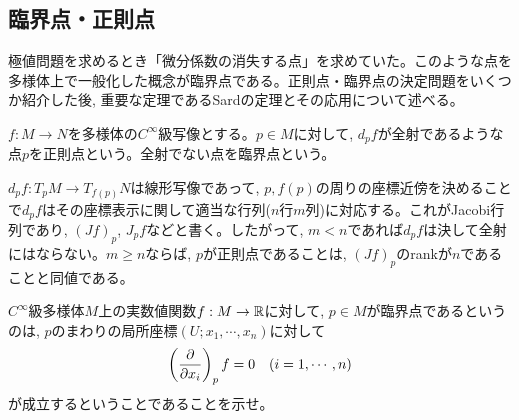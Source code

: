 \subsection{臨界点・正則点}
極値問題を求めるとき「微分係数の消失する点」を求めていた。このような点を多様体上で一般化した概念が臨界点である。正則点・臨界点の決定問題をいくつか紹介した後, 重要な定理であるSardの定理とその応用について述べる。

\begin{defn}
$f:M\to N$を多様体の$C^{\infty}$級写像とする。$p\in M$に対して, $d_{p}f$が全射であるような点$p$を正則点という。全射でない点を臨界点という。
\end{defn}
$d_{p}f:T_{p}M\to T_{f(p)}N$は線形写像であって, $p,f(p)$の周りの座標近傍を決めることで$d_{p}f$はその座標表示に関して適当な行列($n$行$m$列)に対応する。これがJacobi行列であり, $(Jf)_{p}$, $J_{p}f$などと書く。したがって, $m < n$であれば$d_{p}f$は決して全射にはならない。$m\geq n$ならば, $p$が正則点であることは, $(Jf)_{p}$のrankが$n$であることと同値である。
\begin{prac}
$C^{\infty}$級多様体$M$上の実数値関数$f:M\to \mathbb{R}$に対して, $p\in M$が臨界点であるというのは, $p$のまわりの局所座標$(U;x_1,\cdots, x_n)$に対して
\[\left( \dfrac{\partial}{\partial x_i} \right)_{p}f = 0\quad (i=1,\cdots, n)\]
が成立するということであることを示せ。
\end{prac}

